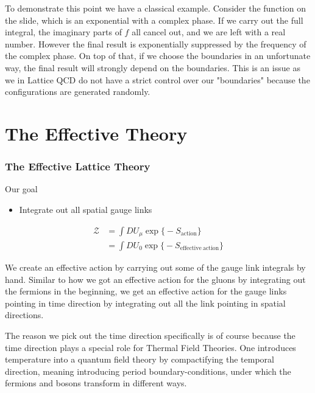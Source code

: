 \documentclass[12pt,a4paper,dvipsnames,usenames]{beamer}
\begin{document}
\begin{frame}
  \note
  {
    To demonstrate this point we have a classical example. Consider the function on the slide, which is an exponential with a
    complex phase. If we carry out the full integral, the imaginary parts of $f$ all cancel out, and we are left with a real
    number. However the final result is exponentially suppressed by the frequency of the complex phase. On top of that, if we
    choose the boundaries in an unfortunate way, the final result will strongly depend on the boundaries. This is an issue as we
    in Lattice QCD do not have a strict control over our "boundaries" because the configurations are generated randomly.
  }

\end{frame}

\section{The Effective Theory}

\sectionframe

\begin{frame}
  \frametitle{The Effective Lattice Theory}

  \begin{alertblock}{Our goal}
    \begin{itemize}
      \item \color{LightUIBase} Integrate out all spatial gauge links
    \end{itemize}
    \begin{align*}
      \mathcal{Z} &= \int D U_{\mu} \exp\big\{ \minus S_{\mathrm{action}} \big\} \\
      &= \int D U_0 \exp\big\{ \minus S_{\mathrm{effective \: action}} \big\}
    \end{align*}
  \end{alertblock}

  \note
  {
    We create an effective action by carrying out some of the gauge link integrals by hand. Similar to how we got an effective
    action for the gluons by integrating out the fermions in the beginning, we get an effective action for the gauge links
    pointing in time direction by integrating out all the link pointing in spatial directions.

    \vspace{1em}

    The reason we pick out the time direction specifically is of course because the time direction plays a special role for
    Thermal Field Theories. One introduces temperature into a quantum field theory by compactifying the temporal direction,
    meaning introducing period boundary-conditions, under which the fermions and bosons transform in different ways.
  }

\end{frame}
\end{document}
